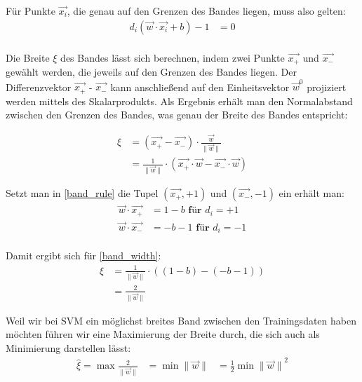 \documentclass[a4paper,11pt,twoside]{scrreprt}
\begin{document}
Für Punkte $\vec{x_{i}}$, die genau auf den Grenzen des Bandes liegen, muss also gelten:
\begin{equation} \label{band_rule}
    \begin{aligned}
    d_{i} (\vec{w} \cdot \vec{x_{i}} + b) -1 &= 0\\
    \end{aligned}
\end{equation}

Die Breite $\xi$ des Bandes lässt sich berechnen, indem zwei Punkte $\vec{x_{+}}$ und $\vec{x_{-}}$ gewählt werden, die jeweils auf den Grenzen des Bandes liegen. Der Differenzvektor $\vec{x_{+}}$ - $\vec{x_{-}}$ kann anschließend auf den Einheitsvektor $\vec{w}^{0}$ projiziert werden mittels des Skalarprodukts. Als Ergebnis erhält man den Normalabstand zwischen den Grenzen des Bandes, was genau der Breite des Bandes entspricht:

\begin{equation} \label{band_width}
    \begin{aligned}
    \xi &= (\vec{x_{+}} - \vec{x_{-}}) \cdot \frac{\vec{w}}{\lVert \vec{w} \rVert}\\
    &=  \frac{1}{\lVert \vec{w} \rVert} \cdot (\vec{x_{+}} \cdot \vec{w} - \vec{x_{-}} \cdot \vec{w})
    \end{aligned}
\end{equation}

Setzt man in \autoref{band_rule} die Tupel $(\vec{x_{+}}, +1)$ und $(\vec{x_{-}}, -1)$ ein erhält man:
\begin{equation} \label{band_width_x}
    \begin{aligned}
     \vec{w} \cdot \vec{x_{+}} &= 1 -b \textbf{ für $d_{i} = +1$}\\
     \vec{w} \cdot \vec{x_{-}} &= -b -1 \textbf{ für $d_{i} = -1$}\\
    \end{aligned}
\end{equation}

Damit ergibt sich für \autoref{band_width}:
\begin{equation} \label{band_width_final}
    \begin{aligned}
    \xi &= \frac{1}{\lVert \vec{w} \rVert} \cdot ((1-b) - (-b-1)) \\
    &= \frac{2}{\lVert \vec{w} \rVert}
    \end{aligned}
\end{equation}

Weil wir bei \ac{SVM} ein möglichst breites Band zwischen den Trainingsdaten haben möchten führen wir eine Maximierung der Breite durch, die sich auch als Minimierung darstellen lässt:
\begin{equation} \label{band_width_max}
    \begin{aligned}
    \hat{\xi} = \max \frac{2}{\lVert \vec{w} \rVert} &= \min {\lVert \vec{w} \rVert} &= \frac{1}{2} \min {\lVert \vec{w} \rVert}^{2}
    \end{aligned}
\end{equation}
\end{document}
